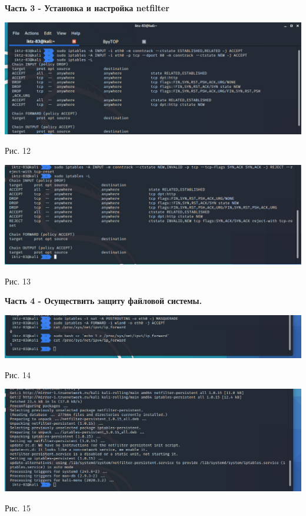 \documentclass[a4paper,14pt]{extarticle}
\begin{document}
   \textbf{Часть 3 - Установка и настройка netfilter}
   \begin{center}
       
        \includegraphics[scale=0.45]{pics/12.png}

        Рис. 12 

        \includegraphics[scale=0.45]{pics/13.png}

        Рис. 13 

   \end{center}

   \textbf{Часть 4 - Осуществить защиту файловой системы.}
   \begin{center}
       
        \includegraphics[scale=0.45]{pics/14.png}

        Рис. 14 

        \includegraphics[scale=0.45]{pics/15.png}

        Рис. 15 

   \end{center}
\end{document}
